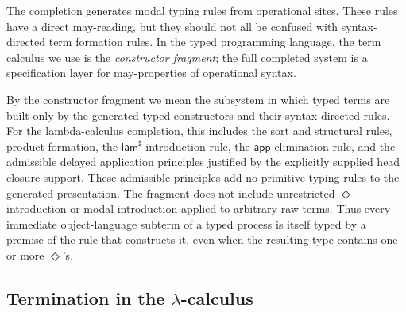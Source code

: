 \documentclass[11pt]{article}
\newcommand{\app}{\mathsf{app}}
\newcommand{\Lam}{\mathsf{lam}^{\sharp}}
\newcommand{\Dia}{\Diamond}
\begin{document}
The completion generates modal typing rules from operational sites.  These
rules have a direct may-reading, but they should not all be confused with
syntax-directed term formation rules.  In the typed programming language, the
term calculus we use is the \emph{constructor fragment}; the full completed
system is a specification layer for may-properties of operational syntax.

By the constructor fragment we mean the subsystem in which typed terms are
built only by the generated typed constructors and their syntax-directed
rules.  For the lambda-calculus completion, this includes the sort and
structural rules, product formation, the \(\Lam\)-introduction rule, the
\(\app\)-elimination rule, and the admissible delayed application principles justified by the explicitly supplied
head closure support.  These admissible principles add no primitive typing rules to the generated presentation.  The fragment does not include unrestricted
\(\Dia\)-introduction or modal-introduction applied to arbitrary raw terms.
Thus every immediate object-language subterm of a typed process is itself typed
by a premise of the rule that constructs it, even when the resulting type
contains one or more \(\Dia\)'s.

\subsection{Termination in the \texorpdfstring{$\lambda$}{λ}-calculus}
\end{document}
